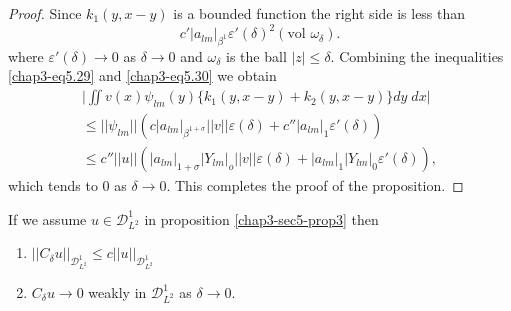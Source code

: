 \begin{proof}
Since $k_1(y, x-y)$ is a bounded function the right side is less than 
\begin{equation*}
c'|a_{lm}|_{\beta^1} \varepsilon' (\delta )^2 (\text{vol }
\omega_{\delta}). \tag{5.30} \label{chap3-eq5.30}
\end{equation*}
where $\varepsilon' (\delta) \to 0$ as $\delta \to 0$ and
$\omega_{\delta}$ is the ball $|z| \leq \delta$. Combining the
inequalities \eqref{chap3-eq5.29} and \eqref{chap3-eq5.30} we obtain 
\begin{gather*}
 \big| \iint v(x) \psi_{lm} (y) \{ k_1 (y, x -y) + k_2 (y, x-y) \} dy
\; dx \big| \\ 
 \leq || \psi_{lm} || (c|a_{lm}|_{\beta^{1+\sigma}} || v || \varepsilon
(\delta ) + c'' |a_{lm}|_1 \varepsilon' (\delta ))\\ 
 \leq c'' || u ||(|a_{lm}|_{1+\sigma}| Y_{lm}|_o ||v|| \varepsilon
(\delta ) + |a_{lm}|_1 |Y_{lm}|_0 \varepsilon' (\delta )), 
\end{gather*}
which tends to 0 as $\delta \to 0$. This completes the proof of the
proposition. 
\end{proof}

\setcounter{corollary}{0}
\begin{corollary}\label{chap3-sec5-coro1}%
If we assume $u \in \mathscr{D}^1_{L^2}$ in proposition
\ref{chap3-sec5-prop3} then  
\begin{enumerate}
\renewcommand{\labelenumi}{\rm(\theenumi)}
\item $|| C_{\delta} u ||_{\mathscr{D}^1_{L^2}} \leq c|| u
  ||_{\mathscr{D}^1_{L^2}}$ 

\item $C_{\delta} u \to 0$ weakly in $\mathscr{D}^1_{L^2}$ as $\delta
  \to 0$. 
\end{enumerate}
\end{corollary}

